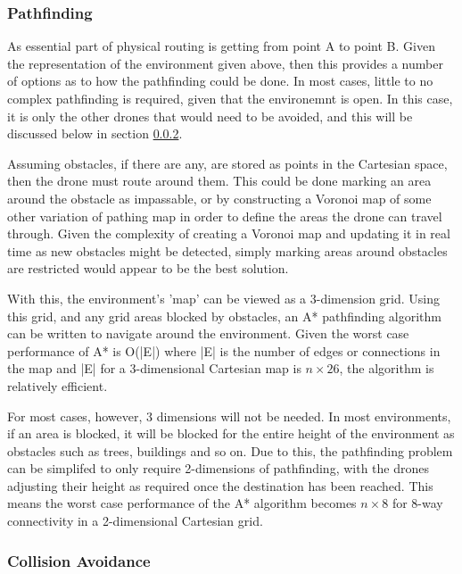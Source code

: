 \subsubsection{Pathfinding}
\label{sec:design_physicalrouting_pathfinding}
		
As essential part of physical routing is getting from point A to point B. Given the representation of the environment given above, then this provides a number of options as to how the pathfinding could be done. In most cases, little to no complex pathfinding is required, given that the environemnt is open. In this case, it is only the other drones that would need to be avoided, and this will be discussed below in section \ref{sec:design_physicalrouting_collisionavoidance}.

Assuming obstacles, if there are any, are stored as points in the Cartesian space, then the drone must route around them. This could be done marking an area around the obstacle as impassable, or by constructing a Voronoi map of some other variation of pathing map in order to define the areas the drone can travel through. Given the complexity of creating a Voronoi map and updating it in real time as new obstacles might be detected, simply marking areas around obstacles are restricted would appear to be the best solution.

With this, the environment's 'map' can be viewed as a 3-dimension grid. Using this grid, and any grid areas blocked by obstacles, an A* pathfinding algorithm can be written to navigate around the environment. Given the worst case performance of A* is O(|E|) where |E| is the number of edges or connections in the map and |E| for a 3-dimensional Cartesian map is $n \times 26$, the algorithm is relatively efficient.

For most cases, however, 3 dimensions will not be needed. In most environments, if an area is blocked, it will be blocked for the entire height of the environment as obstacles such as trees, buildings and so on. Due to this, the pathfinding problem can be simplifed to only require 2-dimensions of pathfinding, with the drones adjusting their height as required once the destination has been reached. This means the worst case performance of the A* algorithm becomes $n \times 8$ for 8-way connectivity in a 2-dimensional Cartesian grid.

\subsubsection{Collision Avoidance}
\label{sec:design_physicalrouting_collisionavoidance}
		
